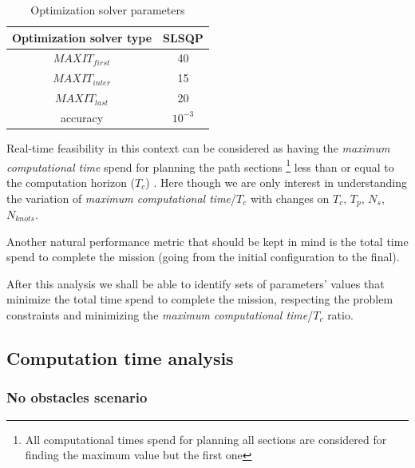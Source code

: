 
\begin{table}[!h]
\caption {Optimization solver parameters} \label{tab:optparam}
\begin{center}
\begin{tabular}{|c|c|}
\hline
Optimization solver type & SLSQP\\
\hline
$MAXIT_{first}$ & 40\\
\hline
$MAXIT_{inter}$ & 15\\
\hline
$MAXIT_{last}$ & 20\\
\hline
accuracy & $10^{-3}$\\
\hline
\end{tabular}
\end{center}
\end{table}

Real-time feasibility in this context can be considered as having the \textit{maximum computational time} spend for planning the path sections \footnote{All computational times spend for planning all sections are considered for finding the maximum value but the first one} less than or equal to the computation horizon ($T_c$) . Here though we are only interest in understanding the variation of \textit{maximum computational time}/$T_c$ with changes on $T_c$, $T_p$, $N_s$, $N_{knots}$.

Another natural performance metric that should be kept in mind is the total time spend to complete the mission (going from the initial configuration to the final).

After this analysis we shall be able to identify sets of parameters' values that minimize the total time spend to complete the mission, respecting the problem constraints and minimizing the \textit{maximum computational time}/$T_c$ ratio.


\subsection{Computation time analysis}

\subsubsection{No obstacles scenario}

